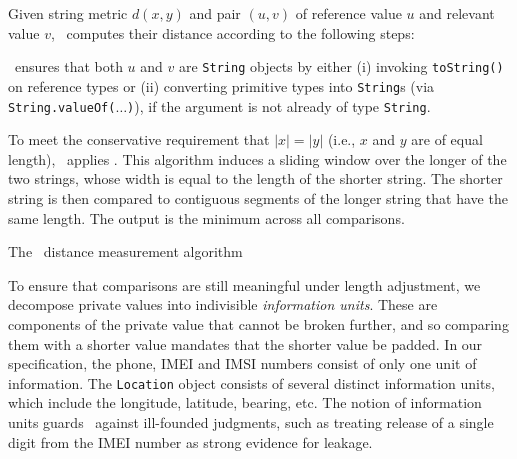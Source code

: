 Given string metric $d(x,y)$ and pair $(u,v)$ of reference value $u$ and relevant value $v$, \Tool\ computes their distance according to the following steps:
\begin{compactenum}
	\item \Tool\ ensures that both $u$ and $v$ are {\tt String} objects by either (i) invoking {\tt toString()} on reference types or (ii) converting primitive types into {\tt String}s 
	(via {\tt String.valueOf($\ldots$)}), if 
	the argument is not already of type {\tt String}.
	\item To meet the conservative requirement that $|x|=|y|$ (i.e., $x$ and $y$ are of equal length), \Tool\ applies . This algorithm induces a sliding window over the longer of the two strings, whose width is equal to the length of the shorter string. The shorter string is then compared to contiguous segments of the longer string that have the same length. The output is the minimum across all comparisons.
\end{compactenum} 


\begin{algorithm}[t]
\begin{small}
\DontPrintSemicolon
{}
\BlankLine
{}
\end{small}
\caption{\label{Al:normalized}The \Tool\ distance measurement algorithm}
\end{algorithm}

To ensure that comparisons are still meaningful under length adjustment, we decompose private values into indivisible \emph{information units}. These are components of the private value that cannot be broken further, and so comparing them with a shorter value mandates that the shorter value be padded. In our specification, the phone, IMEI and IMSI numbers consist of only one unit of information. The {\tt Location} object consists of several distinct information units, which include the longitude, latitude, bearing, etc. The notion of information units guards \Tool\ against ill-founded judgments, such as treating release of a single digit from the IMEI number as strong evidence for leakage.


